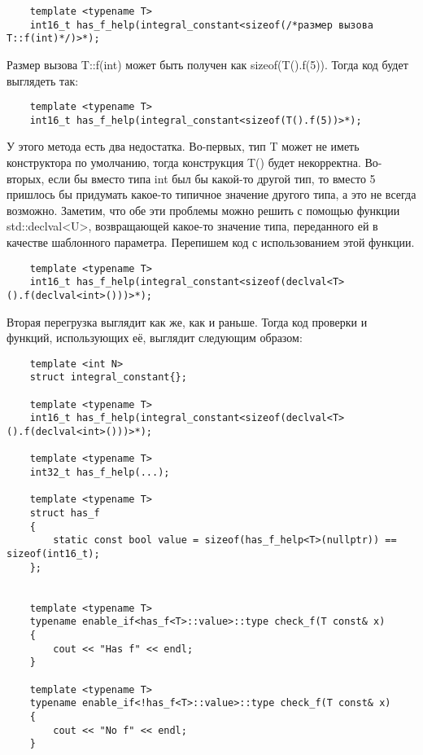 	\begin{verbatim}
	template <typename T>
	int16_t has_f_help(integral_constant<sizeof(/*размер вызова T::f(int)*/)>*);
	\end{verbatim}
	
	Размер вызова T::f(int) может быть получен как sizeof(T().f(5)). Тогда код будет выглядеть так:
	
	\begin{verbatim}
	template <typename T>
	int16_t has_f_help(integral_constant<sizeof(T().f(5))>*);
	\end{verbatim}
	
	У этого метода есть два недостатка. Во-первых, тип T может не иметь конструктора по умолчанию, тогда конструкция T() будет некорректна. Во-вторых, если бы вместо типа int был бы какой-то другой тип, то вместо 5 пришлось бы придумать какое-то типичное значение другого типа, а это не всегда возможно. Заметим, что обе эти проблемы можно решить с помощью функции std::declval<U>, возвращающей какое-то значение типа, переданного ей в качестве шаблонного параметра. Перепишем код с использованием этой функции.

	\begin{verbatim}
	template <typename T>
	int16_t has_f_help(integral_constant<sizeof(declval<T>().f(declval<int>()))>*);
	\end{verbatim}
	
	Вторая перегрузка выглядит как же, как и раньше. Тогда код проверки и функций, использующих её, выглядит следующим образом:

	\begin{verbatim}
	template <int N>
	struct integral_constant{};

	template <typename T>
	int16_t has_f_help(integral_constant<sizeof(declval<T>().f(declval<int>()))>*);

	template <typename T>
	int32_t has_f_help(...);

	template <typename T>
	struct has_f
	{
	    static const bool value = sizeof(has_f_help<T>(nullptr)) == sizeof(int16_t);
	};


	template <typename T>
	typename enable_if<has_f<T>::value>::type check_f(T const& x)
	{
	    cout << "Has f" << endl;
	}

	template <typename T>
	typename enable_if<!has_f<T>::value>::type check_f(T const& x)
	{
	    cout << "No f" << endl;
	}
	\end{verbatim}

	\vspace{\baselineskip}

